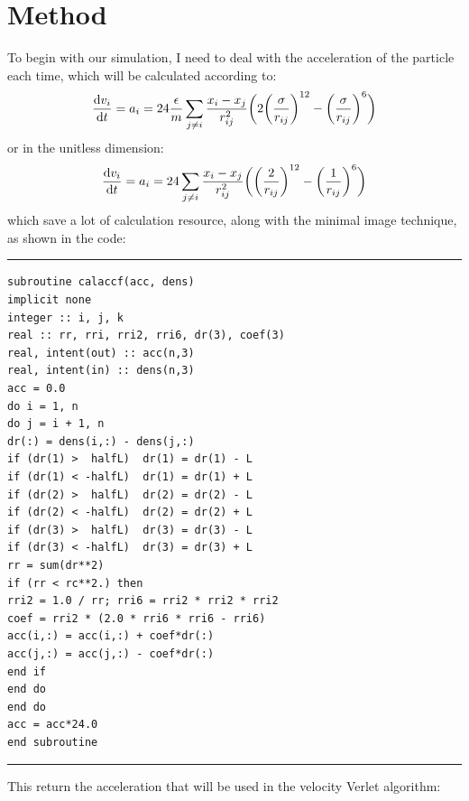 \documentclass[a4paper]{article}
\begin{document}
\section{Method}
To begin with our simulation, I need to deal with the acceleration of the particle each time, which will be calculated according to:
\begin{equation}
\dv{v_i}{t} = a_i = 24 \frac{\epsilon}{m} \sum_{j \neq i} \frac{x_i - x_j}{r_{ij}^2} \bigg( 2 \bigg(\frac{\sigma}{r_{ij}}\bigg)^{12} - \bigg(\frac{\sigma}{r_{ij}}\bigg)^{6}\bigg)
\end{equation}
or in the unitless dimension:
\begin{equation}
	\dv{v_i}{t} = a_i = 24 \sum_{j \neq i} \frac{x_i - x_j}{r_{ij}^2} \bigg( \bigg(\frac{2}{r_{ij}}\bigg)^{12} - \bigg(\frac{1}{r_{ij}}\bigg)^{6}\bigg)
\end{equation}
which save a lot of calculation resource, along with the minimal image technique, as shown in the code:
\rule{\textwidth}{1pt}{\small
\begin{lstlisting}
subroutine calaccf(acc, dens)
implicit none
integer :: i, j, k
real :: rr, rri, rri2, rri6, dr(3), coef(3)
real, intent(out) :: acc(n,3)
real, intent(in) :: dens(n,3)
acc = 0.0
do i = 1, n
do j = i + 1, n
dr(:) = dens(i,:) - dens(j,:)
if (dr(1) >  halfL)  dr(1) = dr(1) - L
if (dr(1) < -halfL)  dr(1) = dr(1) + L
if (dr(2) >  halfL)  dr(2) = dr(2) - L
if (dr(2) < -halfL)  dr(2) = dr(2) + L
if (dr(3) >  halfL)  dr(3) = dr(3) - L
if (dr(3) < -halfL)  dr(3) = dr(3) + L
rr = sum(dr**2)
if (rr < rc**2.) then
rri2 = 1.0 / rr; rri6 = rri2 * rri2 * rri2
coef = rri2 * (2.0 * rri6 * rri6 - rri6)
acc(i,:) = acc(i,:) + coef*dr(:)
acc(j,:) = acc(j,:) - coef*dr(:)
end if
end do
end do
acc = acc*24.0
end subroutine
\end{lstlisting}}

\rule{\textwidth}{1pt}
This return the acceleration that will be used in the velocity Verlet algorithm:
\end{document}
